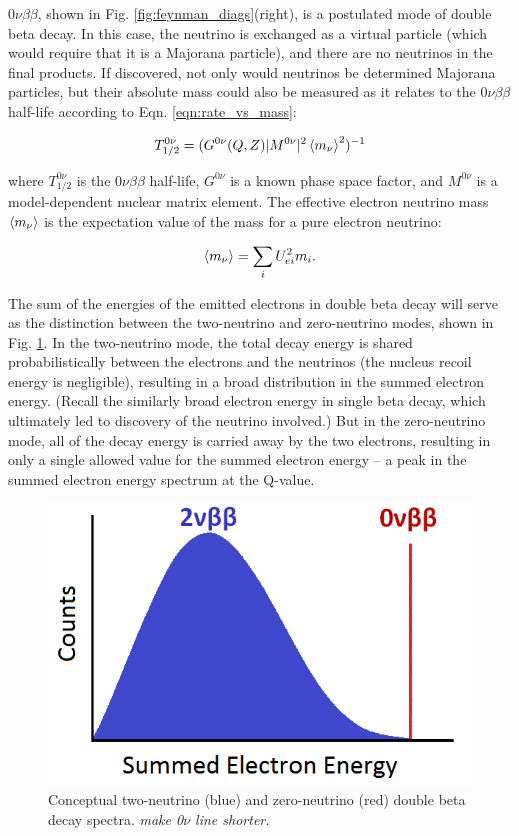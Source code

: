 $0\nu\beta\beta$, shown in Fig. \ref{fig:feynman_diags}(right), is a postulated mode of double beta decay. In this case, the neutrino is exchanged as a virtual particle (which would require that it is a Majorana particle), and there are no neutrinos in the final products. If discovered, not only would neutrinos be determined Majorana particles, but their absolute mass could also be measured as it relates to the $0\nu\beta\beta$ half-life according to Eqn. \ref{eqn:rate_vs_mass}:

\begin{equation}
T_{1/2}^{0\nu} = (G^{0\nu}(Q,Z)|M^{0\nu}|^{2}\braket{m_{\nu}}^{2})^{-1}
\label{eqn:rate_vs_mass}
\end{equation}

\noindent
where $T_{1/2}^{0\nu}$ is the $0\nu\beta\beta$ half-life,  $G^{0\nu}$ is a known phase space factor, and $M^{0\nu}$ is a model-dependent nuclear matrix element. The effective electron neutrino mass $\braket{m_{\nu}}$ is the expectation value of the mass for a pure electron neutrino:

\begin{equation}
\braket{m_{\nu}} = \sum\limits_{i} U_{ei}^{2} m_{i}.
\label{eqn:effectivemass}
\end{equation}

The sum of the energies of the emitted electrons in double beta decay will serve as the distinction between the two-neutrino and zero-neutrino modes, shown in Fig. \ref{fig:spectrum_bb}. In the two-neutrino mode, the total decay energy is shared probabilistically between the electrons and the neutrinos (the nucleus recoil energy is negligible), resulting in a broad distribution in the summed electron energy. (Recall the similarly broad electron energy in single beta decay, which ultimately led to discovery of the neutrino involved.) But in the zero-neutrino mode, all of the decay energy is carried away by the two electrons, resulting in only a single allowed value for the summed electron energy -- a peak in the summed electron energy spectrum at the Q-value. 

\begin{figure} %
        \centering
                \includegraphics[width=.7\textwidth]{figures/spectrum_bb.png}
                \caption{Conceptual two-neutrino (blue) and zero-neutrino (red) double beta decay spectra.  \emph{\color{red}make 0$\nu$ line shorter.}}
\label{fig:spectrum_bb}
\end{figure}

